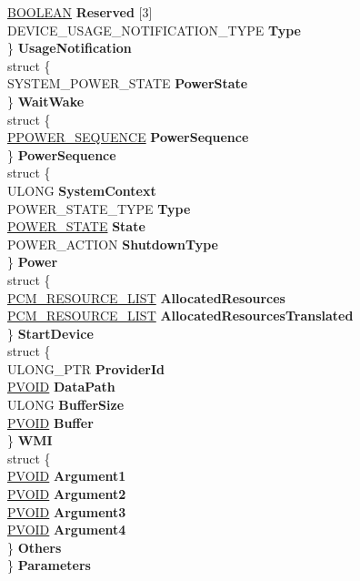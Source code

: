 \begin{DoxyCompactItemize}
\begin{tabbing}
\>\>\hyperlink{_processor_bind_8h_a112e3146cb38b6ee95e64d85842e380a}{BOOLEAN} {\bfseries Reserved} \mbox{[}3\mbox{]}\\
\>\>DEVICE\_USAGE\_NOTIFICATION\_TYPE {\bfseries Type}\\
\>\} {\bfseries UsageNotification}\\
\>struct \{\\
\>\>SYSTEM\_POWER\_STATE {\bfseries PowerState}\\
\>\} {\bfseries WaitWake}\\
\>struct \{\\
\>\>\hyperlink{struct___p_o_w_e_r___s_e_q_u_e_n_c_e}{PPOWER\_SEQUENCE} {\bfseries PowerSequence}\\
\>\} {\bfseries PowerSequence}\\
\>struct \{\\
\>\>ULONG {\bfseries SystemContext}\\
\>\>POWER\_STATE\_TYPE {\bfseries Type}\\
\>\>\hyperlink{union___p_o_w_e_r___s_t_a_t_e}{POWER\_STATE} {\bfseries State}\\
\>\>POWER\_ACTION {\bfseries ShutdownType}\\
\>\} {\bfseries Power}\\
\>struct \{\\
\>\>\hyperlink{struct___c_m___r_e_s_o_u_r_c_e___l_i_s_t}{PCM\_RESOURCE\_LIST} {\bfseries AllocatedResources}\\
\>\>\hyperlink{struct___c_m___r_e_s_o_u_r_c_e___l_i_s_t}{PCM\_RESOURCE\_LIST} {\bfseries AllocatedResourcesTranslated}\\
\>\} {\bfseries StartDevice}\\
\>struct \{\\
\>\>ULONG\_PTR {\bfseries ProviderId}\\
\>\>\hyperlink{interfacevoid}{PVOID} {\bfseries DataPath}\\
\>\>ULONG {\bfseries BufferSize}\\
\>\>\hyperlink{interfacevoid}{PVOID} {\bfseries Buffer}\\
\>\} {\bfseries WMI}\\
\>struct \{\\
\>\>\hyperlink{interfacevoid}{PVOID} {\bfseries Argument1}\\
\>\>\hyperlink{interfacevoid}{PVOID} {\bfseries Argument2}\\
\>\>\hyperlink{interfacevoid}{PVOID} {\bfseries Argument3}\\
\>\>\hyperlink{interfacevoid}{PVOID} {\bfseries Argument4}\\
\>\} {\bfseries Others}\\
\} {\bfseries Parameters}\\


\end{tabbing}
\end{DoxyCompactItemize}
